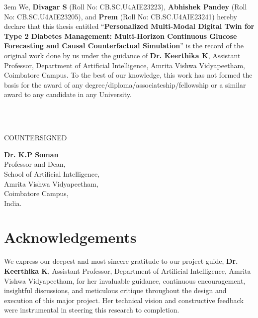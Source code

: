 \documentclass[a4paper, 12pt]{report}
\theoremstyle{definition}
\begin{document}
	\begingroup
	\emergencystretch 3em
	\noindent We, \textbf{Divagar S} (Roll No: CB.SC.U4AIE23223), \textbf{Abhishek Pandey} (Roll No: CB.SC.U4AIE23205), and \textbf{Prem} (Roll No: CB.SC.U4AIE23241) hereby declare that this thesis entitled \enquote{\textbf{Personalized Multi-Modal Digital Twin for Type 2 Diabetes Management: Multi-Horizon Continuous Glucose Forecasting and Causal Counterfactual Simulation}} is the record of the original work done by us under the guidance of \textbf{Dr. Keerthika K}, Assistant Professor, Department of Artificial Intelligence, Amrita Vishwa Vidyapeetham, Coimbatore Campus. To the best of our knowledge, this work has not formed the basis for the award of any degree/diploma/associateship/fellowship or a similar award to any candidate in any University.\\\\
	\endgroup
	
	\vspace*{0.8cm}
	 \\
	\vfill
	\begin{center}
		\large{COUNTERSIGNED}\\
	\end{center}
	\vspace{0.4in}
	
    \begin{center}
		\textbf{Dr. K.P Soman}\\
		Professor and Dean, \\ 
		School of Artificial Intelligence, \\ 
		Amrita Vishwa Vidyapeetham,\\
		Coimbatore Campus,\\
		India.
    \end{center}
	
	\clearpage
	\tableofcontents
	
	\chapter*{Acknowledgements}
	We express our deepest and most sincere gratitude to our project guide, \textbf{Dr. Keerthika K}, Assistant Professor, Department of Artificial Intelligence, Amrita Vishwa Vidyapeetham, for her invaluable guidance, continuous encouragement, insightful discussions, and meticulous critique throughout the design and execution of this major project. Her technical vision and constructive feedback were instrumental in steering this research to completion.
\end{document}
